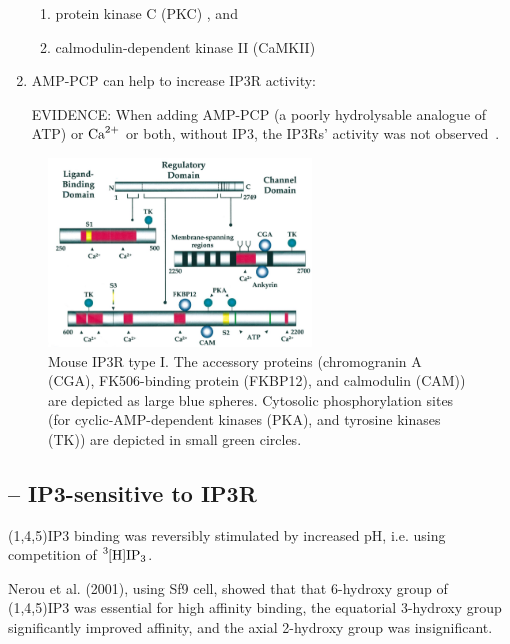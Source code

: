 \begin{enumerate}
\begin{enumerate}
    \item protein kinase C (PKC) \citep{ferris1993,matter1993}, and
    
    \item calmodulin-dependent kinase II (CaMKII) \citep{ferris1993}
  \end{enumerate}
  
  \item AMP-PCP can help to increase IP3R activity:
  
EVIDENCE: When adding AMP-PCP (a poorly hydrolysable analogue of ATP) or ${\text{Ca}^{2+}}$
or both, without IP3, the IP3Rs' activity was not observed~\cite{bezprozvanny1991ip3r}.
  
\end{enumerate}




\begin{figure}[hbt]
  \centerline{\includegraphics[height=5cm,
    angle=0]{./images/IP3R_type_I.eps}}
\caption{Mouse IP3R type I. The accessory proteins (chromogranin A (CGA),
FK506-binding protein (FKBP12), and calmodulin (CAM)) are depicted as large
blue spheres. Cytosolic phosphorylation sites (for cyclic-AMP-dependent
kinases (PKA), and tyrosine kinases (TK)) are depicted in small green circles.}
\label{fig:IP3R_typeI}
\end{figure}


\subsection{-- IP3-sensitive to IP3R}
\label{sec:IP3-affinity-IP3R}

(1,4,5)IP3 binding was reversibly stimulated by increased pH, i.e. using
competition of $\ce{^3[H]IP3}$.

Nerou et al. (2001), using Sf9 cell, showed that that  6-hydroxy group of
(1,4,5)IP3 was essential for high affinity binding, the equatorial 3-hydroxy group
significantly improved affinity, and the axial 2-hydroxy group was
insignificant.


